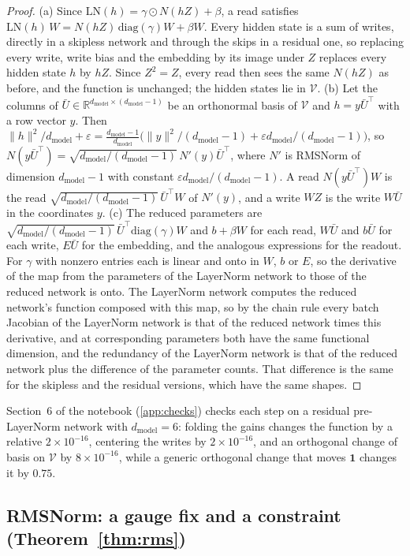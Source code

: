 \documentclass[10pt]{article}
\theoremstyle{definition}
\theoremstyle{remark}
\newcommand{\R}{\mathbb{R}}
\newcommand{\dm}{d_{\mathrm{model}}}
\newcommand{\norm}[1]{\lVert #1\rVert}
\begin{document}
\begin{proof}
(a) Since $\mathrm{LN}(h) = \gamma\odot N(hZ) + \beta$, a read satisfies $\mathrm{LN}(h)\,W = N(hZ)\,\mathrm{diag}(\gamma)W + \beta W$. Every hidden state is a sum of writes, directly in a skipless network and through the skips in a residual one, so replacing every write, write bias and the embedding by its image under $Z$ replaces every hidden state $h$ by $hZ$. Since $Z^2 = Z$, every read then sees the same $N(hZ)$ as before, and the function is unchanged; the hidden states lie in $\mathcal V$.
(b) Let the columns of $\bar U \in \R^{\dm\times(\dm-1)}$ be an orthonormal basis of $\mathcal V$ and $h = y\bar U^\top$ with a row vector $y$. Then $\norm{h}^2/\dm + \varepsilon = \tfrac{\dm-1}{\dm}\big(\norm{y}^2/(\dm-1) + \varepsilon \dm/(\dm-1)\big)$, so $N(y\bar U^\top) = \sqrt{\dm/(\dm-1)}\,N'(y)\bar U^\top$, where $N'$ is RMSNorm of dimension $\dm-1$ with constant $\varepsilon \dm/(\dm-1)$. A read $N(y\bar U^\top)W$ is the read $\sqrt{\dm/(\dm-1)}\,\bar U^\top W$ of $N'(y)$, and a write $WZ$ is the write $W\bar U$ in the coordinates $y$.
(c) The reduced parameters are $\sqrt{\dm/(\dm-1)}\,\bar U^\top\mathrm{diag}(\gamma)W$ and $b + \beta W$ for each read, $W\bar U$ and $b\bar U$ for each write, $E\bar U$ for the embedding, and the analogous expressions for the readout. For $\gamma$ with nonzero entries each is linear and onto in $W$, $b$ or $E$, so the derivative of the map from the parameters of the LayerNorm network to those of the reduced network is onto. The LayerNorm network computes the reduced network's function composed with this map, so by the chain rule every batch Jacobian of the LayerNorm network is that of the reduced network times this derivative, and at corresponding parameters both have the same functional dimension, and the redundancy of the LayerNorm network is that of the reduced network plus the difference of the parameter counts. That difference is the same for the skipless and the residual versions, which have the same shapes.
\end{proof}

Section~6 of the notebook (\cref{app:checks}) checks each step on a residual pre-LayerNorm network with $\dm = 6$: folding the gains changes the function by a relative $2\times10^{-16}$, centering the writes by $2\times10^{-16}$, and an orthogonal change of basis on $\mathcal V$ by $8\times10^{-16}$, while a generic orthogonal change that moves $\mathbf 1$ changes it by $0.75$.

\subsection{RMSNorm: a gauge fix and a constraint\texorpdfstring{ (Theorem~\ref*{thm:rms})}{}}\label{app:prf-rms}
\end{document}
